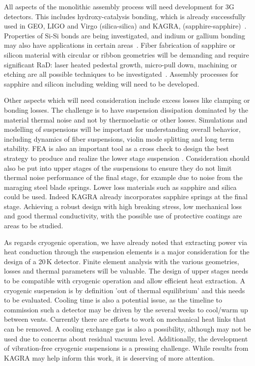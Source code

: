 All aspects of the monolithic assembly process will need development for \ac{3G} detectors. This includes hydroxy-catalysis bonding, which is already successfully used in \ac{GEO}, \ac{LIGO} and \ac{Virgo} (silica-silica) and \ac{KAGRA}, (sapphire-sapphire)~\cite{dari:2010, Amico:2002, vanVeggel:2014, Haughian:2016}. Properties of Si-Si bonds are being investigated, and indium or gallium bonding may also have applications in certain areas~\cite{Hofmann:2015, Murray:2015Low_Temp}.  Fiber fabrication of sapphire or silicon material with circular or ribbon geometries will be demanding and require significant \ac{RaD}: laser heated pedestal growth, micro-pull down, machining or etching are all possible techniques to be investigated~\cite{Cumming:2014Silicon, Alshourbagy:2005}. Assembly processes for sapphire and silicon including welding will need to be developed.

Other aspects which will need consideration include excess losses like clamping or bonding losses. The challenge is to have suspension dissipation dominated by the material thermal noise and not by thermoelastic or other losses.
Simulations and modelling of suspensions will be important for understanding overall behavior, including dynamics of fiber suspensions, violin mode splitting and long term stability. \Ac{FEA} is also an important tool as a cross check to design the best strategy to produce and realize the lower stage suspension \cite{Lorenzini:2010, Sorazu2017Sus}.
Consideration should also be put into upper stages of the suspensions to ensure they do not limit thermal noise performance of the final stage, for example due to noise from the maraging steel blade springs. Lower loss materials such as sapphire and silica could be used. Indeed \ac{KAGRA} already incorporates sapphire springs at the final stage. Achieving a robust design with high breaking stress, low mechanical loss and good thermal conductivity, with the possible use of protective coatings are areas to be studied. 

As regards cryogenic operation, we have already noted that extracting power via heat conduction through the suspension elements is a major consideration for the design of a 20\,K detector. Finite element analysis with the various geometries, losses and thermal parameters will be valuable. The design of upper stages needs to be compatible with cryogenic operation and allow efficient heat extraction. A cryogenic suspension is by definition 'out of thermal equilibrium' and this needs to be evaluated. Cooling time is also a potential issue, as the timeline to commission such a detector may be driven by the several weeks to cool/warm up between vents. Currently there are efforts to work on mechanical heat links that can be removed. A cooling exchange gas is also a possibility, although may not be used due to concerns about residual vacuum level. Additionally, the development of vibration-free cryogenic suspensions is a pressing challenge. While results from \ac{KAGRA} may help inform this work, it is deserving of more attention.

